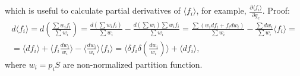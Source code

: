 which is useful to calculate partial derivatives of $\langle f_i \rangle$,
for example, $\frac{\partial \langle f_i \rangle}{\partial g_e}$.
Proof:
\begin{eqnarray}
d \langle f_i \rangle =
d \left( \frac{\sum w_i f_i}{\sum w_i} \right) =
\frac{d(\sum w_i f_i)}{\sum w_i} - \frac{d(\sum w_i) \sum w_i f_i}{\sum w_i} =
\frac{\sum (w_i df_i + f_i dw_i)}{\sum w_i} - \frac{\sum dw_i}{\sum w_i} \langle f_i \rangle = \\
= \langle df_i \rangle + \langle f_i \frac{dw_i}{w_i} \rangle - \langle \frac{dw_i}{w_i} \rangle \langle f_i \rangle =
\langle \delta f_i \delta \left( \frac{dw_i}{w_i} \right) \rangle + \langle df_i \rangle,
\end{eqnarray}
where $w_i = p_i S$ are non-normalized partition function.

